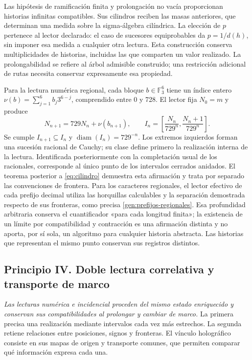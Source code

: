 Las hipótesis de ramificación finita y prolongación no vacía proporcionan
historias infinitas compatibles. Sus cilindros reciben las masas anteriores,
que determinan una medida sobre la sigma-álgebra cilíndrica. La elección de
\(p\) pertenece al lector declarado: el caso de sucesores equiprobables da
\(p=1/d(h)\), sin imponer esa medida a cualquier otra lectura. Esta
construcción conserva multiplicidades de historias, incluidas las que
comparten un valor realizado. La prolongabilidad se refiere al árbol
admisible construido; una restricción adicional de rutas necesita conservar
expresamente esa propiedad.

Para la lectura numérica regional, cada bloque
\(b\in\mathbb F_3^6\) tiene un índice entero
\(\nu(b)=\sum_{j=1}^6 b_j3^{6-j}\), comprendido entre 0 y 728.
El lector fija \(N_0=m\) y produce
\[
 N_{n+1}=729N_n+\nu(b_{n+1}),\qquad
 I_n=\left[\frac{N_n}{729^n},\frac{N_n+1}{729^n}\right].
\]
Se cumple \(I_{n+1}\subseteq I_n\) y
\(\operatorname{diam}(I_n)=729^{-n}\). Los extremos izquierdos forman
una sucesión racional de Cauchy; su clase define primero la realización
interna de la lectura. Identificada posteriormente con la completación
usual de los racionales, corresponde al único punto de los intervalos
cerrados anidados. El teorema posterior a \eqref{eq:cilindro} demuestra
esta afirmación y trata por separado las convenciones de frontera. Para
los caracteres regionales, el lector efectivo de cada prefijo decimal
utiliza las horquillas calculables y la separación demostrada respecto de
sus fronteras, como precisa \cref{gen:prefijos-regionales}. Esa profundidad
arbitraria conserva el cuantificador «para cada longitud finita»; la
existencia de un límite por compatibilidad y contracción es una afirmación
distinta y no aporta, por sí sola, un algoritmo para cualquier historia
abstracta. Las historias que representan el mismo punto conservan sus
registros distintos.

\subsection*{Principio IV. Doble lectura correlativa y transporte de marco}
\hypertarget{prinh:doble}{}

\emph{Las lecturas numérica e incidencial proceden del mismo estado
enriquecido y conservan sus compatibilidades al prolongar y cambiar de
marco.} La primera precisa una realización mediante intervalos cada vez
más estrechos. La segunda retiene relaciones entre posiciones, signos y
fronteras. El vínculo holográfico consiste en sus mapas de origen y
transporte comunes, que permiten comparar qué información expresa cada una.

